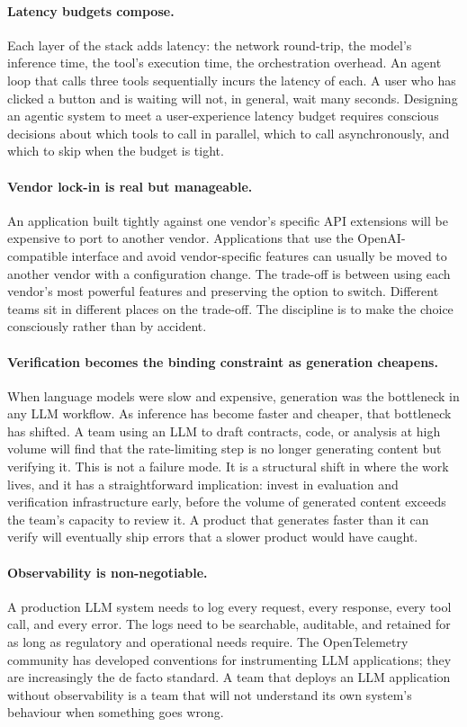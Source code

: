 \paragraph{Latency budgets compose.} Each layer of the stack
adds latency: the network round-trip, the model's
inference time, the tool's execution time, the orchestration
overhead. An agent loop that calls three tools sequentially
incurs the latency of each. A user who has clicked a button
and is waiting will not, in general, wait many seconds.
Designing an agentic system to meet a user-experience
latency budget requires conscious decisions about which tools
to call in parallel, which to call asynchronously, and which
to skip when the budget is tight.

\paragraph{Vendor lock-in is real but manageable.} An
application built tightly against one vendor's specific API
extensions will be expensive to port to another vendor.
Applications that use the OpenAI-compatible interface and
avoid vendor-specific features can usually be moved to
another vendor with a configuration change. The trade-off is
between using each vendor's most powerful features and
preserving the option to switch. Different teams sit in
different places on the trade-off. The discipline is to make
the choice consciously rather than by accident.

\paragraph{Verification becomes the binding constraint as
generation cheapens.} When language models were slow and
expensive, generation was the bottleneck in any LLM workflow.
As inference has become faster and cheaper, that bottleneck
has shifted. A team using an LLM to draft contracts, code, or
analysis at high volume will find that the rate-limiting step
is no longer generating content but verifying it. This is not
a failure mode. It is a structural shift in where the work
lives, and it has a straightforward implication: invest in
evaluation and verification infrastructure early, before the
volume of generated content exceeds the team's capacity to
review it. A product that generates faster than it can verify
will eventually ship errors that a slower product would have
caught.

\paragraph{Observability is non-negotiable.} A production
LLM system needs to log every request, every response, every
tool call, and every error. The logs need to be searchable,
auditable, and retained for as long as regulatory and
operational needs require. The OpenTelemetry community has
developed conventions for instrumenting LLM applications;
they are increasingly the de facto standard. A team that
deploys an LLM application without observability is a team
that will not understand its own system's behaviour when
something goes wrong.

